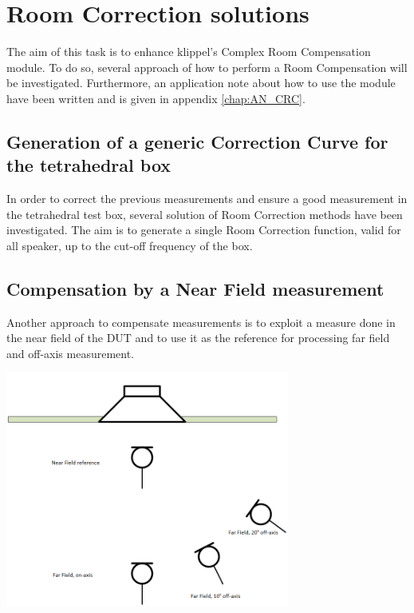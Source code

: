 \documentclass{report}
\begin{document}
\section{Room Correction solutions}


The aim of this task is to enhance klippel's Complex Room Compensation module. To do so, several approach of how to perform a Room Compensation will be investigated. Furthermore, an application note about how to use the module have been written and is given in appendix \ref{chap:AN_CRC}.


\subsection{Generation of a generic Correction Curve for the tetrahedral box}
In order to correct the previous measurements and ensure a good measurement in the tetrahedral test box, several solution of Room Correction methods have been investigated. The aim is to generate a single Room Correction function, valid for all speaker, up to the cut-off frequency of the box.

\subsection{Compensation by a Near Field measurement}

Another approach to compensate measurements is to exploit a measure done in the near field of the DUT and to use it as the reference for processing far field and off-axis measurement. 

\begin{minipage}{0.4\textwidth}
\begin{center}
	\includegraphics[width=0.7\textwidth]{RoomComp/NFFF_Setup} 
    \captionsetup{hypcap=false} 
	\label{fig:SetupNFFF}
\end{center}
\end{minipage}
\begin{minipage}{0.6\textwidth}

\end{minipage}
\end{document}
